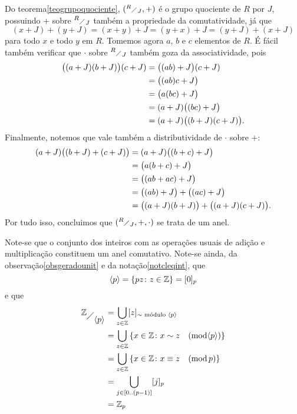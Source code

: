 \begin{dem}
  Do teorema\xspace\ref{teogrupoquociente}, $(^{R}{\scriptstyle\diagup}_{{J}},+)$ é o
  grupo quociente de $R$ por $J$, possuindo $+$ sobre $^{R}{\scriptstyle\diagup}_{{J}}$
  também a
  propriedade da comutatividade, já que
  \begin{equation*}
    (x+J)+(y+J) = (x+y)+J = (y+x)+J = (y+J)+(x+J)
  \end{equation*}
  para todo $x$ e todo $y$ em $R$. Tomemos agora $a$, $b$ e $c$
  elementos de $R$. É fácil também verificar que $\cdot$
  sobre $^{R}{\scriptstyle\diagup}_{{J}}$ também goza da associatividade, pois
  \begin{equation*}
    \begin{aligned}
      \bigl((a+J)(b+J)\bigr)(c+J) &= \bigl((ab)+J\bigr)(c+J) \\
      &= \bigl((ab)c+J\bigr) \\ &= \bigl(a(bc)+J\bigr) \\
      &= (a+J)\bigl((bc)+J\bigr) \\ &= (a+J)\bigl((b+J)(c+J)\bigr)\mathrm{.}
    \end{aligned}
  \end{equation*}
  Finalmente, notemos que vale também a distributividade de $\cdot$
  sobre $+$:
  \begin{equation*}
    \begin{aligned}
      (a+J)\bigl((b+J)+(c+J)\bigr)
        &= (a+J)\bigl((b+c)+J\bigr) \\
        &= \bigl(a(b+c)+J\bigr) \\
        &= \bigl((ab+ac)+J\bigr) \\
        &= \bigl((ab)+J\bigr) + \bigl((ac)+J\bigr) \\
        &= \bigl((a+J)(b+J)\bigr) + \bigl((a+J)(c+J)\bigr)\mathrm{.}
    \end{aligned}
  \end{equation*}
  Por tudo isso, concluimos que $(^{R}{\scriptstyle\diagup}_{{J}},+,\cdot)$ se trata de um
  anel.
\end{dem}

\begin{Obs}\label{obszp}
  Note-se que o conjunto dos inteiros com as operações usuais de adição
  e multiplicação constituem um anel comutativo. Note-se ainda,
  da observação\xspace\ref{obsgeradounit} e da
  notação\xspace\ref{notcleqint}, que
  \begin{equation*}
    \langle p\rangle = \left\{ pz\colon z\in\mathbb{Z} \right\} = [0]_{p}
  \end{equation*}
  e que
  \begin{equation*}
    \begin{aligned}
      \cquoc{\MMZ}{\gerado{p}}
      &= \bigcup_{z\in\MMZ}
        \cleq{z}{\text{$\sim$ módulo $\gerado{p}$}} \\
      &= \bigcup_{z\in\MMZ} \cjpp{x\in
        \MMZ}{\congmodright{x}{z}{\gerado{p}}} \\
      &= \bigcup_{z\in\MMZ} \cjpp{x\in\MMZ}{\congmod{x}{z}{p}} \\
      &= \bigcup_{j\in[0..(p-1)]} \cleq{j}{p}\\
      &= \MMZ_p
    \end{aligned}
  \end{equation*}
\end{Obs}

